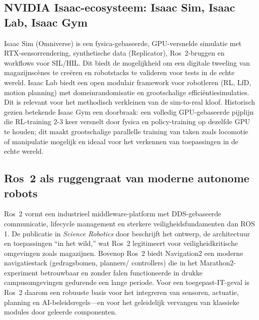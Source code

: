 \subsection{NVIDIA Isaac-ecosysteem: Isaac Sim, Isaac Lab, Isaac Gym}
Isaac Sim (Omniverse) is een fysica-gebaseerde, GPU-versnelde simulatie met RTX-sensorrendering, synthetische data (Replicator), Ros~2-bruggen en workflows voor SIL/HIL. Dit biedt de mogelijkheid om een digitale tweeling van magazijnscènes te creëren en robotstacks te valideren voor tests in de echte wereld.  
Isaac Lab biedt een open modulair framework voor robotleren (RL, LfD, motion planning) met domeinrandomisatie en grootschalige efficiëntiesimulaties. Dit is relevant voor het methodisch verkleinen van de sim-to-real kloof. Historisch gezien betekende Isaac Gym een doorbraak: een volledig GPU-gebaseerde pijplijn die RL-training 2-3 keer versnelt door fysica en policy-training op dezelfde GPU te houden; dit maakt grootschalige parallelle training van taken zoals locomotie of manipulatie mogelijk en ideaal voor het verkennen van toepassingen in de echte wereld.
\autocite{NVIDIA2025, IsaacLab2025, Makoviychuk2021}

\subsection{Ros~2 als ruggengraat van moderne autonome robots}
Ros~2 vormt een industrieel middleware-platform met DDS-gebaseerde communicatie, lifecycle management en sterkere veiligheidsfundamenten dan ROS 1. 
De publicatie in \textit{Science Robotics} door 
\textcite{Macenski2022}
beschrijft het ontwerp, de architectuur en toepassingen “in het wild,” wat Ros~2 legitimeert voor veiligheidkritische omgevingen zoals magazijnen. 
Bovenop Ros~2 biedt Navigation2 een moderne navigatiestack (gedragsbomen, planners/ controllers) die in het Marathon2-experiment \textcite{Macenski2020} betrouwbaar en zonder falen functioneerde in drukke campusomgevingen gedurende een lange periode. 
Voor een toegepast-IT-geval is Ros~2 daarom een robuuste basis voor het integreren van sensoren, actuatie, planning en AI-beleidsregels—en voor het geleidelijk vervangen van klassieke modules door geleerde componenten.
\autocite{OpenNavigation2025}


